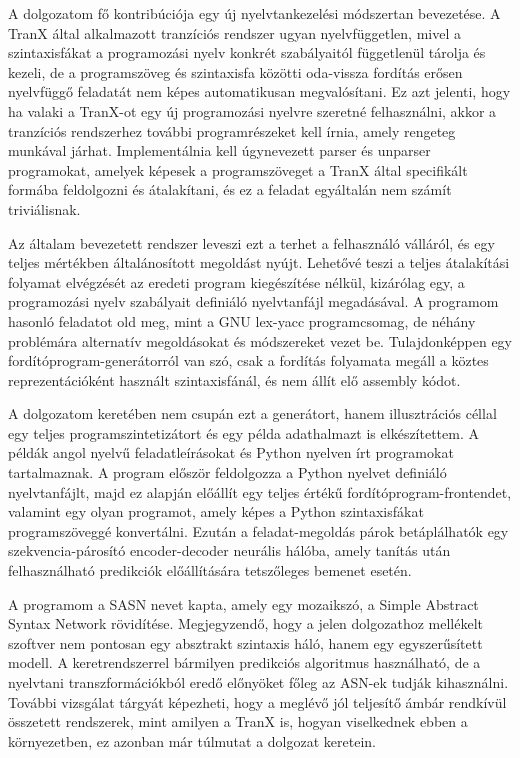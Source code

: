 \documentclass[twoside, 12pt]{report}
\begin{document}
A dolgozatom fő kontribúciója egy új nyelvtankezelési módszertan bevezetése. A TranX által alkalmazott tranzíciós rendszer ugyan nyelvfüggetlen, mivel a szintaxisfákat a programozási nyelv konkrét szabályaitól függetlenül tárolja és kezeli, de a programszöveg és szintaxisfa közötti oda-vissza fordítás erősen nyelvfüggő feladatát nem képes automatikusan megvalósítani. Ez azt jelenti, hogy ha valaki a TranX-ot egy új programozási nyelvre szeretné felhasználni, akkor a tranzíciós rendszerhez további programrészeket kell írnia, amely rengeteg munkával járhat. Implementálnia kell úgynevezett parser és unparser programokat, amelyek képesek a programszöveget a TranX által specifikált formába feldolgozni és átalakítani, és ez a feladat egyáltalán nem számít triviálisnak.

Az általam bevezetett rendszer leveszi ezt a terhet a felhasználó válláról, és egy teljes mértékben általánosított megoldást nyújt. Lehetővé teszi a teljes átalakítási folyamat elvégzését az eredeti program kiegészítése nélkül, kizárólag egy, a programozási nyelv szabályait definiáló nyelvtanfájl megadásával. A programom hasonló feladatot old meg, mint a GNU lex-yacc programcsomag, de néhány problémára alternatív megoldásokat és módszereket vezet be. Tulajdonképpen egy fordítóprogram-generátorról van szó, csak a fordítás folyamata megáll a köztes reprezentációként használt szintaxisfánál, és nem állít elő assembly kódot.

A dolgozatom keretében nem csupán ezt a generátort, hanem illusztrációs céllal egy teljes programszintetizátort és egy példa adathalmazt is elkészítettem. A példák angol nyelvű feladatleírásokat és Python nyelven írt programokat tartalmaznak. A program először feldolgozza a Python nyelvet definiáló nyelvtanfájlt, majd ez alapján előállít egy teljes értékű fordítóprogram-frontendet, valamint egy olyan programot, amely képes a Python szintaxisfákat programszöveggé konvertálni. Ezután a feladat-megoldás párok betáplálhatók egy szekvencia-párosító encoder-decoder neurális hálóba, amely tanítás után felhasználható predikciók előállítására tetszőleges bemenet esetén.

A programom a SASN nevet kapta, amely egy mozaikszó, a Simple Abstract Syntax Network rövidítése. Megjegyzendő, hogy a jelen dolgozathoz mellékelt szoftver nem pontosan egy absztrakt szintaxis háló, hanem egy egyszerűsített modell. A keretrendszerrel bármilyen predikciós algoritmus használható, de a nyelvtani transzformációkból eredő előnyöket főleg az ASN-ek tudják kihasználni. További vizsgálat tárgyát képezheti, hogy a meglévő jól teljesítő ámbár rendkívül összetett rendszerek, mint amilyen a TranX is, hogyan viselkednek ebben a környezetben, ez azonban már túlmutat a dolgozat keretein.
\end{document}
